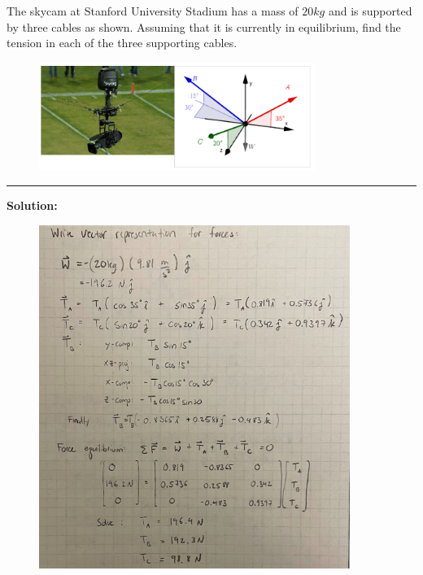 
The skycam at Stanford University Stadium has a mass of $20 kg$ and is supported by three cables as shown. Assuming that it is currently in equilibrium, find the tension in each of the three supporting cables.

\begin{figure}[ht!]
  \centering
  \includegraphics[width=0.8\textwidth,height=0.5\textheight,keepaspectratio]{fig.png}
\end{figure}


\vspace{.5cm}
\rule{\textwidth}{.4pt}
\vspace{.5cm}
\textbf{Solution:}
\begin{figure}[ht!]
  \centering
  \includegraphics[width=0.9\textwidth,
	           height=0.4\textheight,
		   keepaspectratio]{soln.png}
\end{figure}

